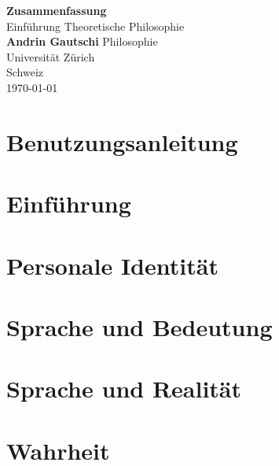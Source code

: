 \documentclass[12pt]{report}
\begin{document}
\begin{titlepage}
	\begin{center}
        \vspace*{9cm}
        \Huge\textbf{Zusammenfassung}\\
        \vspace{0.5cm}
        \LARGE Einführung Theoretische Philosophie   
        \vspace{2cm}\\
        \textbf{Andrin Gautschi}
        \vfill
        \Large
        Philosophie\\
        Universität Zürich\\
        Schweiz\\
        \today
    \end{center}
\end{titlepage}


\tableofcontents
\newpage


\chapter{Benutzungsanleitung}


\chapter{Einführung}


\chapter{Personale Identität}


\chapter{Sprache und Bedeutung}\label{ChapterSpracheUndBedeutung}


\chapter{Sprache und Realität}


\chapter{Wahrheit}

\end{document}
